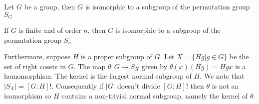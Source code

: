 \documentclass[12pt]{article}
\begin{document}
Let $G$ be a group, then $G$ is isomorphic to a subgroup of the permutation group $S_{G}$

If $G$ is finite and of order $n$, then $G$ is isomorphic to a subgroup of the permutation group $S_{n}$

Furthermore, suppose $H$ is a proper subgroup of $G$. Let $X = \{Hg | g \in G\}$ be the set of right cosets in $G$. The map $\theta:G \to S_{X}$ given by $\theta(x)(Hg) = Hgx$ is a homomorphism. The kernel is the largest normal subgroup of $H$. We note that $|S_X| = [G : H]!$. Consequently if $|G|$ doesn't divide $[G :  H]!$ then $\theta$ is not an isomorphism so $H$ contains a non-trivial normal subgroup, namely the kernel of $\theta$.
\end{document}
